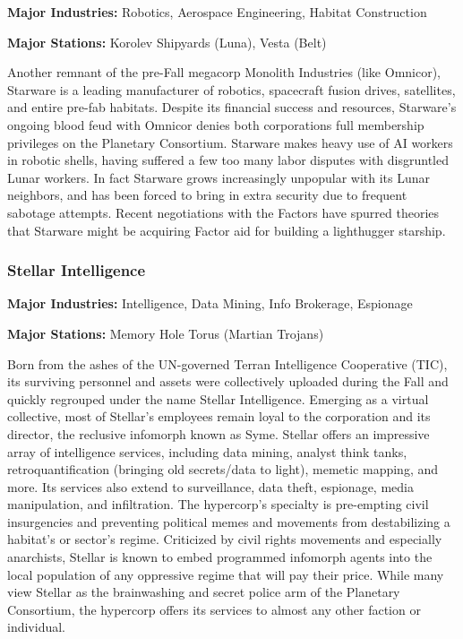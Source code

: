 \textbf{Major Industries:} Robotics, Aerospace Engineering, Habitat Construction

\textbf{Major Stations:} Korolev Shipyards (Luna), Vesta (Belt)


Another remnant of the pre-Fall megacorp Monolith Industries (like
Omnicor), Starware is a leading manufacturer of robotics, spacecraft
fusion drives, satellites, and entire pre-fab habitats. Despite its
financial success and resources, Starware's ongoing blood feud with
Omnicor denies both corporations full membership privileges on the
Planetary Consortium. Starware makes heavy use of AI workers in
robotic shells, having suffered a few too many labor disputes with
disgruntled Lunar workers. In fact Starware grows increasingly
unpopular with its Lunar neighbors, and has been forced to bring in
extra security due to frequent sabotage attempts. Recent negotiations
with the Factors have spurred theories that Starware might be
acquiring Factor aid for building a lighthugger starship.

\subsubsection{Stellar Intelligence}
\label{sec:stellar-intelligence}

\textbf{Major Industries:} Intelligence, Data Mining, Info Brokerage, Espionage

\textbf{Major Stations:} Memory Hole Torus (Martian Trojans)


Born from the ashes of the UN-governed Terran Intelligence Cooperative
(TIC), its surviving personnel and assets were collectively uploaded
during the Fall and quickly regrouped under the name Stellar
Intelligence.  Emerging as a virtual collective, most of Stellar's
employees remain loyal to the corporation and its director, the
reclusive infomorph known as Syme. Stellar offers an impressive array
of intelligence services, including data mining, analyst think tanks,
retroquantification (bringing old secrets/data to light), memetic
mapping, and more. Its services also extend to surveillance, data
theft, espionage, media manipulation, and infiltration. The
hypercorp's specialty is pre-empting civil insurgencies and preventing
political memes and movements from destabilizing a habitat's or
sector's regime. Criticized by civil rights movements and especially
anarchists, Stellar is known to embed programmed infomorph agents into
the local population of any oppressive regime that will pay their
price. While many view Stellar as the brainwashing and secret police
arm of the Planetary Consortium, the hypercorp offers its services to
almost any other faction or individual.


